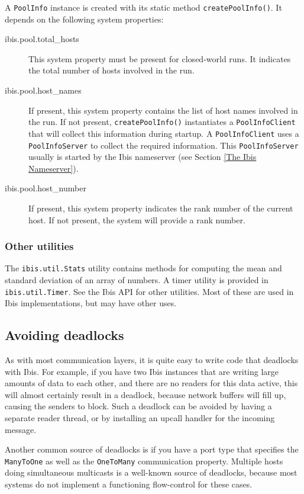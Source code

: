 \documentclass[10pt]{article}
\newcommand{\mysubsection}[1]{\subsection{#1}\label{#1}}
\newcommand{\mysubsubsection}[1]{\subsubsection{#1}\label{#1}}
\begin{document}
\noindent
A \texttt{PoolInfo} instance is created with its 
static method \texttt{createPoolInfo()}.
It depends on the following system properties:
\begin{description}
\item[ibis.pool.total\_hosts]
This system property must be present for closed-world runs.
It indicates the total number of hosts involved in the run.
\item[ibis.pool.host\_names]
If present, this system property contains the list of host names
involved in the run.
If not present, \texttt{createPoolInfo()} instantiates
a \texttt{PoolInfoClient}
that will collect this information during startup.
A \texttt{PoolInfoClient} uses a \texttt{PoolInfoServer} to collect the
required information.
This \texttt{PoolInfoServer} usually is started by the Ibis nameserver
(see Section \ref{The Ibis Nameserver}).

\item[ibis.pool.host\_number]
If present, this system property indicates the rank number of the
current host. If not present, the system will provide a rank number.
\end{description}

\mysubsubsection{Other utilities}

The \texttt{ibis.util.Stats} utility contains methods for computing
the mean and standard deviation of an array of numbers.
A timer utility is provided in \texttt{ibis.util.Timer}.
See the Ibis API for other utilities. Most of these are used in
Ibis implementations, but may have other uses.

\mysubsection{Avoiding deadlocks}

As with most communication layers, it is quite easy to write code that
deadlocks with Ibis. For example, if you have two Ibis instances that
are writing large amounts of data to each other, and there are no
readers for this data active, this will almost certainly result in a deadlock,
because network buffers will fill up, causing the senders to block.
Such a deadlock can be avoided by having a separate reader thread,
or by installing an upcall handler for the incoming message.

Another common source of deadlocks is if you have a port type that
specifies the \texttt{ManyToOne} as well as the \texttt{OneToMany}
communication property. Multiple hosts doing simultaneous multicasts
is a well-known source of deadlocks, because most systems do not
implement a functioning flow-control for these cases.
\end{document}

